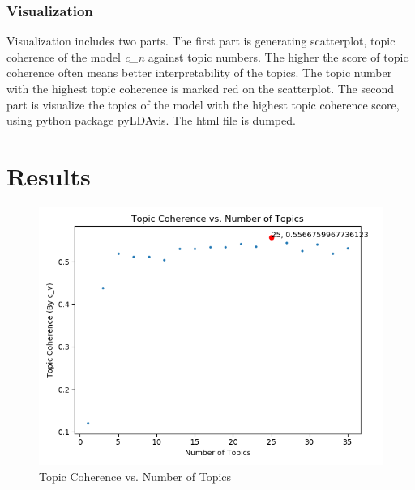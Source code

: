\documentclass{article} %
\begin{document}
    \subsubsection{Visualization}
Visualization includes two parts. The first part is generating scatterplot, topic coherence of the model \textit{c\_n} against topic numbers. The higher the score of topic coherence
    often means better interpretability of the topics. The topic number with the highest topic coherence is marked red on the scatterplot. The second
    part is visualize the topics of the model with the highest topic coherence score, using python package pyLDAvis. The html file is dumped.

    \section{Results}
    \begin{figure}[H]
        \graphicspath{ {images/} }
        \begin{center}
            \includegraphics[scale=0.8]{coherence.png}
        \end{center}
        \caption{Topic Coherence vs. Number of Topics}
    \end{figure}
\end{document}
